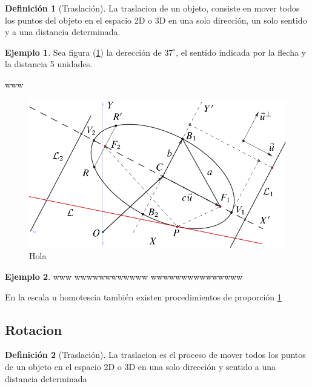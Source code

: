 \documentclass[
  16pt,
]{krantz}
\theoremstyle{definition}
\newtheorem{definition}{Definición}[chapter]
\theoremstyle{definition}
\newtheorem{example}{Ejemplo}[chapter]
\theoremstyle{definition}
\theoremstyle{definition}
\theoremstyle{remark}
\begin{document}
\begin{definition}[Traslación]
\protect\hypertarget{def:traslacion}{}\label{def:traslacion}La traslacion de un objeto, consiste en mover todos los puntos del objeto en el espacio 2D o 3D en una solo dirección, un solo sentido y a una distancia determinada.
\end{definition}

\begin{example}
\protect\hypertarget{exm:unnamed-chunk-2}{}\label{exm:unnamed-chunk-2}Sea figura (\ref{fig:Doge}) la derección de \(37^\circ\), el sentido indicada por la flecha y la distancia 5 unidades.
\end{example}

www

\begin{figure}

{\centering \includegraphics{elipse} 

}

\caption{Hola}\label{fig:Doge}
\end{figure}

\begin{example}
\protect\hypertarget{exm:unnamed-chunk-3}{}\label{exm:unnamed-chunk-3}www wwwwwwwwwwww wwwwwwwwwwwwwww
\end{example}

En la escala u homotescia también existen procedimientos de proporción \ref{fig:Doge}

\hypertarget{rotacion}{%
\subsection{Rotacion}\label{rotacion}}

\begin{definition}[Traslación]
\protect\hypertarget{def:rotacion}{}\label{def:rotacion}La traslacion es el proceso de mover todos los puntos de un objeto en el espacio 2D o 3D en una solo dirección y sentido a una distancia determinada
\end{definition}
\end{document}
